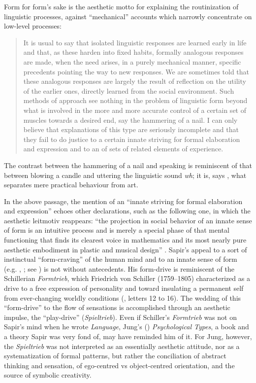 \documentclass[output=paper]{langscibook}
\begin{document}
Form for form's sake is the aesthetic motto for explaining the routinization of linguistic processes, against ``mechanical'' accounts which narrowly concentrate on low-level processes:

\begin{quotation}
It is usual to say that isolated linguistic responses are learned early in life and that, as these harden into fixed habits, formally analogous responses are made, when the need arises, in a purely mechanical manner, specific precedents pointing the way to new responses. We are sometimes told that these analogous responses are largely the result of reflection on the utility of the earlier ones, directly learned from the social environment. Such methods of approach see nothing in the problem of linguistic form beyond what is involved in the more and more accurate control of a certain set of muscles towards a desired end, say the hammering of a nail. I can only believe that explanations of this type are seriously incomplete and that they fail to do justice to a certain innate striving for formal elaboration and expression and to an  of sets of related elements of experience. \citep[156]{Sapir1924} 
\end{quotation}

The contrast between the hammering of a nail and speaking is reminiscent of that between blowing a candle and uttering the linguistic sound \emph{wh}; it is, says \citet[34]{Sapir1925}, what separates mere practical behaviour from art.

In the above passage, the mention of an ``innate striving for formal elaboration and expression'' echoes other declarations, such as the following one, in which the aesthetic leitmotiv reappears: ``the projection in social behavior of an innate sense of form is an intuitive process and is merely a special phase of that mental functioning that finds its clearest voice in mathematics and its most nearly pure aesthetic embodiment in plastic and musical design'' \citep[344]{Sapir1927a}. Sapir's appeal to a sort of instinctual ``form-craving'' of the human mind and to an innate sense of form (e.g. \citealt{Sapir1924}, \citealt{Sapir1927a}; see \citealt[445]{Handler1986}) is not without antecedents. His form-drive is reminiscent of the Schillerian \emph{Formtrieb}, which Friedrich von Schiller (1759--1805) characterized as a drive to a free expression of personality and toward insulating a permanent self from ever-changing worldly conditions (\citealt{Schiller1795}, letters 12 to 16). The wedding of this ``form-drive'' to the flow of sensations is accomplished through an aesthetic impulse, the ``play-drive'' (\emph{Spieltrieb}). Even if Schiller's \emph{Formtrieb} was not on Sapir's mind when he wrote \emph{Language}, Jung's (\citeyear{Jung1921}) \emph{Psychological Types}, a book and a theory Sapir was very fond of, may have reminded him of it. For Jung, however, the \emph{Spieltrieb} was not interpreted as an essentially aesthetic attitude, nor as a systematization of formal patterns, but rather the conciliation of abstract thinking and sensation, of ego-centred vs object-centred orientation, and the source of symbolic creativity.
\end{document}
